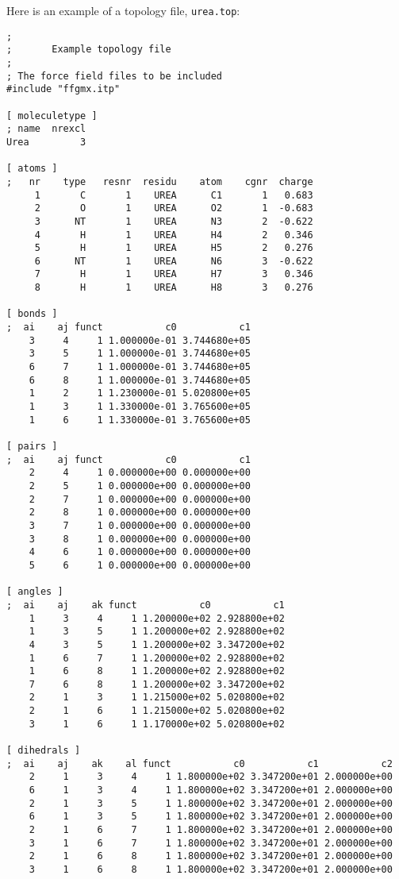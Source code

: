 Here is an example of a topology file, \verb'urea.top':
{\small\begin{verbatim}
;
;       Example topology file
;
; The force field files to be included
#include "ffgmx.itp"    

[ moleculetype ]
; name  nrexcl
Urea         3

[ atoms ]
;   nr    type   resnr  residu    atom    cgnr  charge
     1       C       1    UREA      C1       1   0.683  
     2       O       1    UREA      O2       1  -0.683
     3      NT       1    UREA      N3       2  -0.622
     4       H       1    UREA      H4       2   0.346
     5       H       1    UREA      H5       2   0.276
     6      NT       1    UREA      N6       3  -0.622
     7       H       1    UREA      H7       3   0.346
     8       H       1    UREA      H8       3   0.276

[ bonds ]
;  ai    aj funct           c0           c1
    3     4     1 1.000000e-01 3.744680e+05 
    3     5     1 1.000000e-01 3.744680e+05 
    6     7     1 1.000000e-01 3.744680e+05 
    6     8     1 1.000000e-01 3.744680e+05 
    1     2     1 1.230000e-01 5.020800e+05 
    1     3     1 1.330000e-01 3.765600e+05 
    1     6     1 1.330000e-01 3.765600e+05 

[ pairs ]
;  ai    aj funct           c0           c1
    2     4     1 0.000000e+00 0.000000e+00 
    2     5     1 0.000000e+00 0.000000e+00 
    2     7     1 0.000000e+00 0.000000e+00 
    2     8     1 0.000000e+00 0.000000e+00 
    3     7     1 0.000000e+00 0.000000e+00 
    3     8     1 0.000000e+00 0.000000e+00 
    4     6     1 0.000000e+00 0.000000e+00 
    5     6     1 0.000000e+00 0.000000e+00 

[ angles ]
;  ai    aj    ak funct           c0           c1
    1     3     4     1 1.200000e+02 2.928800e+02 
    1     3     5     1 1.200000e+02 2.928800e+02 
    4     3     5     1 1.200000e+02 3.347200e+02 
    1     6     7     1 1.200000e+02 2.928800e+02 
    1     6     8     1 1.200000e+02 2.928800e+02 
    7     6     8     1 1.200000e+02 3.347200e+02 
    2     1     3     1 1.215000e+02 5.020800e+02 
    2     1     6     1 1.215000e+02 5.020800e+02 
    3     1     6     1 1.170000e+02 5.020800e+02 

[ dihedrals ]
;  ai    aj    ak    al funct           c0           c1           c2
    2     1     3     4     1 1.800000e+02 3.347200e+01 2.000000e+00 
    6     1     3     4     1 1.800000e+02 3.347200e+01 2.000000e+00 
    2     1     3     5     1 1.800000e+02 3.347200e+01 2.000000e+00 
    6     1     3     5     1 1.800000e+02 3.347200e+01 2.000000e+00 
    2     1     6     7     1 1.800000e+02 3.347200e+01 2.000000e+00 
    3     1     6     7     1 1.800000e+02 3.347200e+01 2.000000e+00 
    2     1     6     8     1 1.800000e+02 3.347200e+01 2.000000e+00 
    3     1     6     8     1 1.800000e+02 3.347200e+01 2.000000e+00 


\end{verbatim}}
